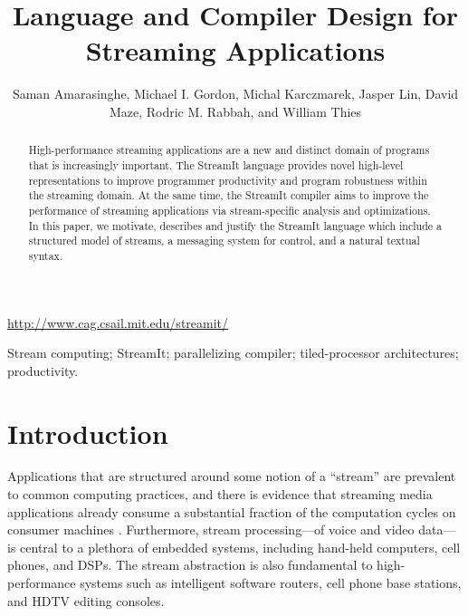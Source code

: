 \documentclass[final]{ijpp}
\begin{document}
  \title{Language and Compiler Design for Streaming Applications}   

  \author{Saman Amarasinghe, Michael I. Gordon, Michal Karczmarek,
	    Jasper Lin, David Maze, Rodric M. Rabbah, and William Thies}

 
  \urldef\streamiturl\url{http://www.cag.csail.mit.edu/streamit/}

  \maketitle
  

  \begin{abstract}
  High-performance  streaming  applications  are  a new  and  distinct
  domain  of programs  that is  increasingly important.   The StreamIt
  language  provides  novel   high-level  representations  to  improve
  programmer productivity and  program robustness within the streaming
  domain.  At the same time, the StreamIt compiler aims to improve the
  performance of  streaming applications via  stream-specific analysis
  and  optimizations.   In  this  paper, we  motivate,  describes  and
  justify the  StreamIt language which  include a structured  model of
  streams,  a messaging  system  for control,  and  a natural  textual
  syntax.
  \end{abstract}

  \begin{keywords}
  Stream computing; StreamIt; parallelizing compiler;
  tiled-processor architectures; productivity.
  \end{keywords}

\clearpage

\doublespacing


\section{Introduction}
\label{sec:intro}

Applications that  are structured around  some notion of  a ``stream''
are  prevalent to common computing practices, and there is
evidence   that  streaming  media   applications  already   consume  a
substantial fraction  of the  computation cycles on  consumer machines
\cite{rixner98bandwidthefficient}. Furthermore, stream processing---of
voice and video  data---is central to a plethora  of embedded systems,
including  hand-held  computers, cell  phones,  and  DSPs. The  stream
abstraction is  also fundamental  to high-performance systems  such as
intelligent  software  routers, cell  phone  base  stations, and  HDTV
editing consoles.
\end{document}
